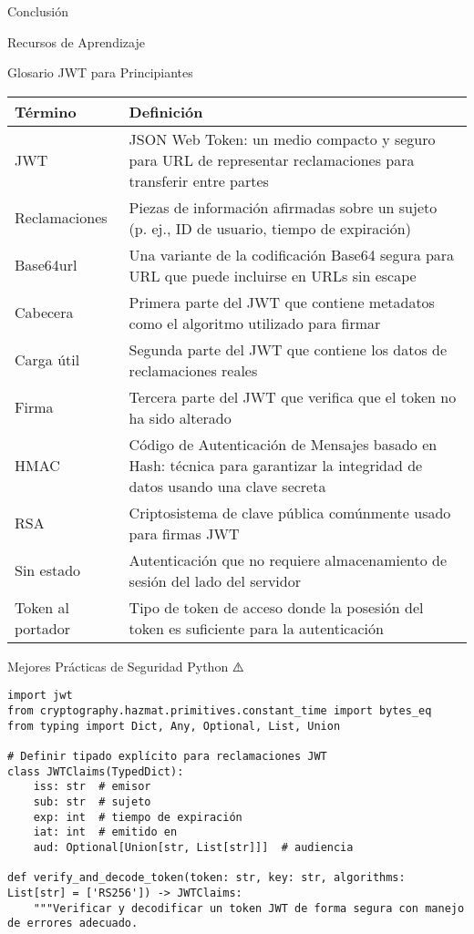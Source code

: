 \documentclass[presentation,aspectratio=169]{beamer}
\begin{document}
\begin{frame}[label={sec:org8853002},fragile]{Conclusión}
\begin{block}{Recursos de Aprendizaje}
\begin{itemize}[<+->]
\end{itemize}
\end{block}
\begin{block}{Glosario JWT para Principiantes 🔰}
\begin{center}
\begin{tabular}{ll}
Término & Definición\\
\hline
JWT & JSON Web Token: un medio compacto y seguro para URL de representar reclamaciones para transferir entre partes\\
Reclamaciones & Piezas de información afirmadas sobre un sujeto (p. ej., ID de usuario, tiempo de expiración)\\
Base64url & Una variante de la codificación Base64 segura para URL que puede incluirse en URLs sin escape\\
Cabecera & Primera parte del JWT que contiene metadatos como el algoritmo utilizado para firmar\\
Carga útil & Segunda parte del JWT que contiene los datos de reclamaciones reales\\
Firma & Tercera parte del JWT que verifica que el token no ha sido alterado\\
HMAC & Código de Autenticación de Mensajes basado en Hash: técnica para garantizar la integridad de datos usando una clave secreta\\
RSA & Criptosistema de clave pública comúnmente usado para firmas JWT\\
Sin estado & Autenticación que no requiere almacenamiento de sesión del lado del servidor\\
Token al portador & Tipo de token de acceso donde la posesión del token es suficiente para la autenticación\\
\end{tabular}
\end{center}
\end{block}
\begin{block}{Mejores Prácticas de Seguridad Python ⚠️}
\begin{verbatim}
import jwt
from cryptography.hazmat.primitives.constant_time import bytes_eq
from typing import Dict, Any, Optional, List, Union

# Definir tipado explícito para reclamaciones JWT
class JWTClaims(TypedDict):
    iss: str  # emisor
    sub: str  # sujeto
    exp: int  # tiempo de expiración
    iat: int  # emitido en
    aud: Optional[Union[str, List[str]]]  # audiencia

def verify_and_decode_token(token: str, key: str, algorithms: List[str] = ['RS256']) -> JWTClaims:
    """Verificar y decodificar un token JWT de forma segura con manejo de errores adecuado.


\end{verbatim}
\end{block}
\end{frame}
\end{document}
